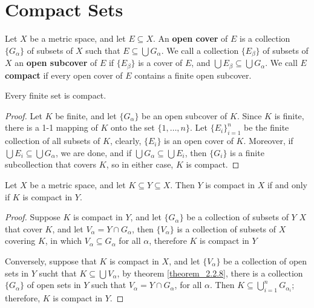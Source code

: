 \section{Compact Sets}\label{section_2.3}

\begin{definition}
  Let $X$ be a metric space, and let $E \subseteq X$. An \textbf{open cover} of
  $E$ is a collection $\{G_{\alpha}\}$ of subsets of  $X$ such that  $E \subseteq
  \bigcup{G_{\alpha}}$. We call a collection  $\{E_{\beta}\}$ of subsets of  $X$ an
  \textbf{open subcover} of  $E$ if  $\{E_{\beta}\}$ is a cover of  $E$, and
  $\bigcup{E_{\beta}} \subseteq \bigcup{G_{\alpha}}$. We call $E$ \textbf{compact}
  if every open cover of  $E$ contains a finite open subcover.
\end{definition}

\begin{lemma}\label{lemma_2.3.1}
  Every finite set is compact.
\end{lemma}
\begin{proof}
  Let $K$ be finite, and let  $\{G_{\alpha}\}$ be an open subcover of  $K$. Since
  $K$ is finite, there is a 1-1 mapping of  $K$ onto the set  $\{1,\dots, n\}$. Let
  $\{E_i\}_{i=1}^{n}$	be the finite collection of all subsets of $K$, clearly,
  $\{E_i\}$ is an open cover of $K$. Moreover, if  $\bigcup{E_i} \subseteq
  \bigcup{G_{\alpha}}$, we are done, and if $\bigcup{G_{\alpha}} \subseteq
  \bigcup{E_i}$, then $\{G_i\}$ is a finite subcollection that
  covers  $K$, so in either case,  $K$ is compact.
\end{proof}

\begin{theorem}\label{theorem_2.3.2}
  Let $X$ be a metric space, and let  $K \subseteq Y \subseteq X$. Then  $Y$ is
  compact in  $X$ if and only if  $K$ is compact in  $Y$.
\end{theorem}
\begin{proof}
  Suppose $K$ is compact in  $Y$, and let  $\{G_{\alpha}\}$ be a collection of
  subsets of  $Y$ $X$ that cover  $K$, and let  $V_{\alpha}=Y \cap G_{\alpha}$,
  then  $\{V_{\alpha}\}$ is a collection of subsets of  $X$ covering  $K$, in which
  $V_{\alpha} \subseteq G_{\alpha}$ for all  $\alpha$, therefore  $K$ is compact
  in $Y$

  Conversely, suppose that $K$ is compact in $X$, and let  $\{V_{\alpha}\}$ be a
  collection of open sets in  $Y$ sucht that  $K \subseteq \bigcup{V_{\alpha}}$,
  by theorem \ref{theorem_2.2.8}, there is a collection $\{G_{\alpha}\}$ of open
  sets in $Y$ such that  $V_{\alpha}=Y \cap G_{\alpha}$, for all  $\alpha$. Then
  $K \subseteq \bigcup_{i=1}^{n}{G_{\alpha_i}}$; therefore,  $K$ is compact in
  $Y$.
\end{proof}

